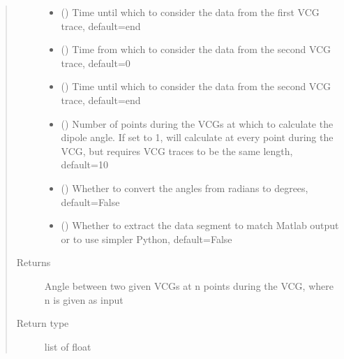 \documentclass[letterpaper,10pt,english]{sphinxmanual}
\begin{document}
\begin{fulllineitems}
\begin{quote}
\begin{description}
\begin{itemize}
\item {} 
\sphinxAtStartPar
{} (\sphinxstyleliteralemphasis{\sphinxupquote{, }}) \textendash{} Time until which to consider the data from the first VCG trace, default=end

\item {} 
\sphinxAtStartPar
{} (\sphinxstyleliteralemphasis{\sphinxupquote{, }}) \textendash{} Time from which to consider the data from the second VCG trace, default=0

\item {} 
\sphinxAtStartPar
{} (\sphinxstyleliteralemphasis{\sphinxupquote{, }}) \textendash{} Time until which to consider the data from the second VCG trace, default=end

\item {} 
\sphinxAtStartPar
{} (\sphinxstyleliteralemphasis{\sphinxupquote{, }}) \textendash{} Number of points during the VCGs at which to calculate the dipole angle. If set to \sphinxhyphen{}1, will calculate at
every point during the VCG, but requires VCG traces to be the same length, default=10

\item {} 
\sphinxAtStartPar
{} (\sphinxstyleliteralemphasis{\sphinxupquote{, }}) \textendash{} Whether to convert the angles from radians to degrees, default=False

\item {} 
\sphinxAtStartPar
{} (\sphinxstyleliteralemphasis{\sphinxupquote{, }}) \textendash{} Whether to extract the data segment to match Matlab output or to use simpler Python, default=False

\end{itemize}

\item[{Returns}] \leavevmode
\sphinxAtStartPar
{} \textendash{} Angle between two given VCGs at n points during the VCG, where n is given as input

\item[{Return type}] \leavevmode
\sphinxAtStartPar
list of float

\end{description}\end{quote}

\end{fulllineitems}
\end{document}
